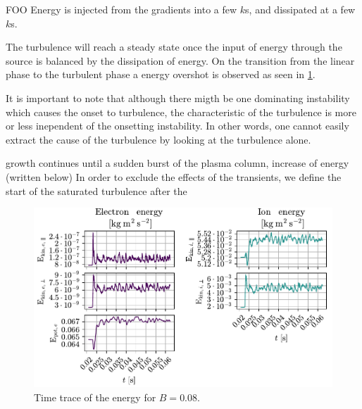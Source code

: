 FOO
Energy is injected from the gradients into a few $k$s, and dissipated at a few $k$s.


The turbulence will reach a steady state once the input of energy through the source is balanced by the dissipation of energy.
On the transition from the linear phase to the turbulent phase a energy overshot is observed as seen in \cref{fig:energyTrace008}.



It is important to note that although there migth be one dominating instability which causes the onset to turbulence, the characteristic of the turbulence is more or less inependent of the onsetting instability.
In other words, one cannot easily extract the cause of the turbulence by looking at the turbulence alone.





growth continues until a sudden burst of the plasma column,
increase of energy (written below)
In order to exclude the effects of the transients, we define the start of the saturated turbulence after the










%
\begin{figure}[htb]
    \centering
    \includegraphics[width=1.0\textwidth]{fig/results/energyTrace/energyTraceB008}
    \caption{Time trace of the energy for $B=0.08$.}
    \label{fig:energyTrace008}
\end{figure}

